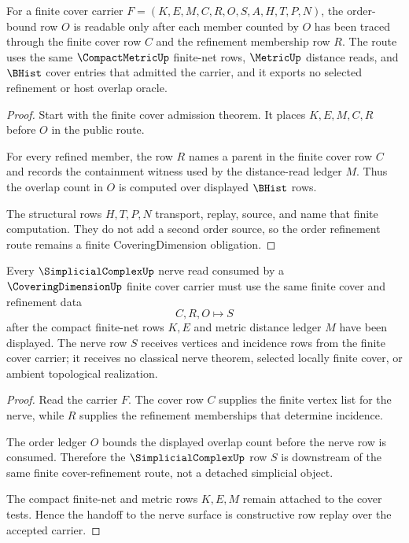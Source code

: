\begin{theorem}
\label{thm:coveringdimension-order-refinement-route}
For a finite cover carrier $F=(K,E,M,C,R,O,S,A,H,T,P,N)$, the order-bound row $O$ is readable only after each member counted by $O$ has been traced through the finite cover row $C$ and the refinement membership row $R$. The route uses the same $\CompactMetricUp$ finite-net rows, $\MetricUp$ distance reads, and $\BHist$ cover entries that admitted the carrier, and it exports no selected refinement or host overlap oracle.
\end{theorem}
\begin{proof}
Start with the finite cover admission theorem. It places $K,E,M,C,R$ before $O$ in the public route.

For every refined member, the row $R$ names a parent in the finite cover row $C$ and records the containment witness used by the distance-read ledger $M$. Thus the overlap count in $O$ is computed over displayed $\BHist$ rows.

The structural rows $H,T,P,N$ transport, replay, source, and name that finite computation. They do not add a second order source, so the order refinement route remains a finite CoveringDimension obligation.
\end{proof}

\begin{theorem}
\label{thm:coveringdimension-simplicial-nerve-handoff}
Every $\SimplicialComplexUp$ nerve read consumed by a $\CoveringDimensionUp$ finite cover carrier must use the same finite cover and refinement data
$$
C,R,O
\longmapsto
S
$$
after the compact finite-net rows $K,E$ and metric distance ledger $M$ have been displayed. The nerve row $S$ receives vertices and incidence rows from the finite cover carrier; it receives no classical nerve theorem, selected locally finite cover, or ambient topological realization.
\end{theorem}
\begin{proof}
Read the carrier $F$. The cover row $C$ supplies the finite vertex list for the nerve, while $R$ supplies the refinement memberships that determine incidence.

The order ledger $O$ bounds the displayed overlap count before the nerve row is consumed. Therefore the $\SimplicialComplexUp$ row $S$ is downstream of the same finite cover-refinement route, not a detached simplicial object.

The compact finite-net and metric rows $K,E,M$ remain attached to the cover tests. Hence the handoff to the nerve surface is constructive row replay over the accepted carrier.
\end{proof}


